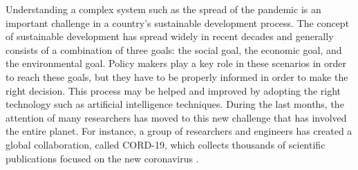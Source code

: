 \documentclass[review]{elsarticle}
\begin{document}
Understanding a complex system such as the spread of the pandemic is an important challenge in a country's sustainable development process. The concept of sustainable development has spread widely in recent decades and generally consists of a combination of three goals: the social goal, the economic goal, and the environmental goal. Policy makers play a key role in these scenarios in order to reach these goals, but they have to be properly informed in order to make the right decision. This process may be helped and improved by adopting the right technology such as artificial intelligence techniques.
During the last months, the attention of many researchers has moved to this new challenge that has involved the entire planet. For instance, a group of researchers and engineers has created a global collaboration, called CORD-19, which collects thousands of scientific publications focused on the new coronavirus \cite{Wang2020CORD19TC}.
\end{document}
